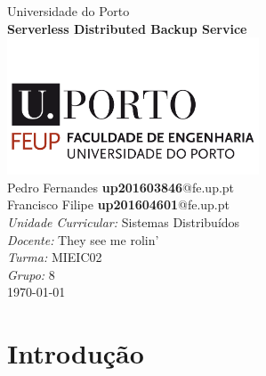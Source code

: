 \documentclass[11pt,oneside]{book}
\begin{document}

\frontmatter

\begin{titlepage}

\begin{center}
{\LARGE Universidade do Porto}\\[1.5cm]
\linespread{1.2}\huge {\bfseries Serverless Distributed Backup Service}\\[1.5cm]
\linespread{1}
\includegraphics[width=7.5cm]{feup.png}\\[1cm]
{\large Pedro Fernandes \textbf{up201603846}@fe.up.pt}\\
{\large Francisco Filipe \textbf{up201604601}@fe.up.pt}\\[1cm]
{\large \emph{Unidade Curricular:} Sistemas Distribuídos}\\
{\large \emph{Docente:} They see me rolin'}\\
{\large \emph{Turma:} MIEIC02}\\
{\large \emph{Grupo:} 8}\\[2cm]

\large \today
\end{center}

\end{titlepage}


\doublespacing
\tableofcontents
\singlespacing


\mainmatter

\section{Introdução}
\end{document}
